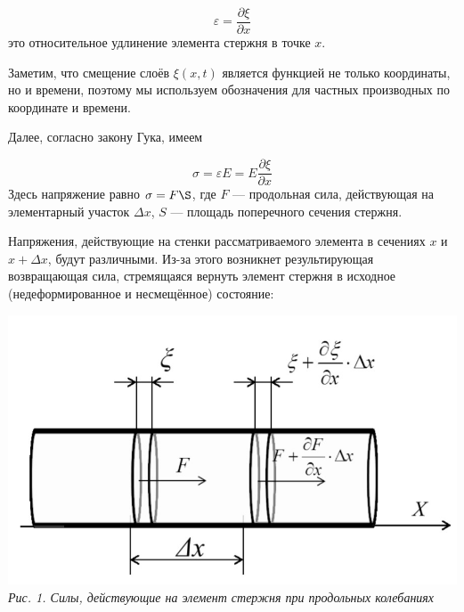 \documentclass[12pt, a4paper]{article}
\begin{document}
\begin{equation}
    \varepsilon = \frac{\partial\xi}{\partial x}
\end{equation}
это относительное удлинение элемента стержня в точке $x$.

Заметим, что смещение слоёв $\xi(x,t)$ является функцией не только координаты, но и времени, 
поэтому мы используем обозначения для частных производных по координате и времени.

Далее, согласно закону Гука, имеем

\noindent\begin{minipage}[c]{0.4\textwidth}
    \hspace{1cm}
    \begin{equation}
        \sigma = \varepsilon E = E\frac{\partial\xi}{\partial x}
    \end{equation}
    Здесь напряжение равно $\sigma = F\S$, где $F$ --- продольная сила, действующая на элементарный
    участок $\Delta x$, $S$ --- площадь поперечного сечения стержня.

    Напряжения, действующие
    на стенки рассматриваемого
    элемента в сечениях $x$ и $x + \Delta x$,
    будут различными. Из-за этого
    возникнет результирующая возвращающая сила, стремящаяся
    вернуть элемент стержня в исходное (недеформированное и
    несмещённое) состояние:

\end{minipage}
\begin{minipage}[c]{0.57\textwidth}
    \begin{center}
        \includegraphics[scale=0.58]{Pics/picture1.jpg} \\
        \textit{\textcolor[HTML]{000000}{Рис. 1. Силы, действующие на элемент стержня при продольных колебаниях}}
    \end{center}
\end{minipage}  
\end{document}
